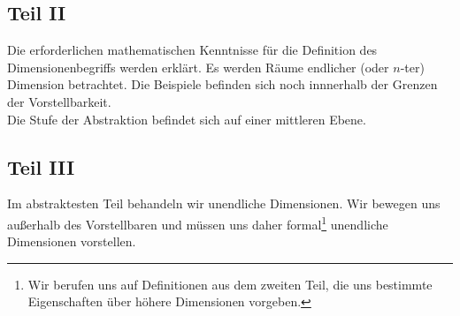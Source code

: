 \subsection*{Teil II}
Die erforderlichen mathematischen Kenntnisse für die Definition des Dimensionenbegriffs werden erklärt. Es werden Räume endlicher (oder $n$-ter) Dimension betrachtet. Die Beispiele befinden sich noch innnerhalb der Grenzen der Vorstellbarkeit.
\\ Die Stufe der Abstraktion befindet sich auf einer mittleren Ebene.
\subsection*{Teil III}
Im abstraktesten Teil behandeln wir unendliche Dimensionen. Wir bewegen uns außerhalb des Vorstellbaren und müssen uns daher formal\footnote{Wir berufen uns auf Definitionen aus dem zweiten Teil, die uns bestimmte Eigenschaften über höhere Dimensionen vorgeben.} unendliche Dimensionen vorstellen.



